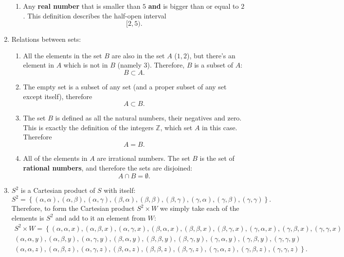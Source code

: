 \begin{enumerate}
\begin{enumerate}[label={(\roman*)}]
			\item Any \textbf{real number} that is smaller than $5$ \textbf{and} is bigger than or equal to $2$. This definition describes the half-open interval
				\[
					[2,5).
				\]
		\end{enumerate}

	\item Relations between sets:
		\begin{enumerate}[label={(\roman*)}]
			\item All the elements in the set $B$ are also in the set $A$ ($1,2$), but there's an element in $A$ which is not in $B$ (namely $3$). Therefore, $B$ is a subset of $A$:
				\[
					B\subset A.
				\]

			\item The empty set is a subset of any set (and a proper subset of any set except itself), therefore
				\[
					A\subset B.
				\]

			\item The set $B$ is defined as all the natural numbers, their negatives and zero. This is exactly the definition of the integers $\mathbb{Z}$, which set $A$ in this case. Therefore
				\[
					A=B.
				\]

			\item All of the elements in $A$ are irrational numbers. The set $B$ is the set of \textbf{rational numbers}, and therefore the sets are disjoined:
				\[
					A\cap B = \emptyset.
				\]
		\end{enumerate}

	\item $S^{2}$ is a Cartesian product of $S$ with itself:
		\[
			S^{2} = \left\{ (\alpha,\alpha), (\alpha,\beta), (\alpha,\gamma), (\beta,\alpha), (\beta,\beta), (\beta,\gamma), (\gamma,\alpha), (\gamma,\beta), (\gamma,\gamma) \right\}.
		\]
		Therefore, to form the Cartesian product $S^{2}\times W$ we simply take each of the elements is $S^{2}$ and add to it an element from $W$:
		\begin{align*}
			S^{2}\times W =
			\left\{(\alpha,\alpha,x), (\alpha,\beta,x), (\alpha,\gamma,x), (\beta,\alpha,x), (\beta,\beta,x), (\beta,\gamma,x), (\gamma,\alpha,x), (\gamma,\beta,x), (\gamma,\gamma,x)\right.\\
			\left.(\alpha,\alpha,y), (\alpha,\beta,y), (\alpha,\gamma,y), (\beta,\alpha,y), (\beta,\beta,y), (\beta,\gamma,y), (\gamma,\alpha,y), (\gamma,\beta,y), (\gamma,\gamma,y)\right.\\
			\left.(\alpha,\alpha,z), (\alpha,\beta,z), (\alpha,\gamma,z), (\beta,\alpha,z), (\beta,\beta,z), (\beta,\gamma,z), (\gamma,\alpha,z), (\gamma,\beta,z), (\gamma,\gamma,z)\right\}.
		\end{align*}


\end{enumerate}
